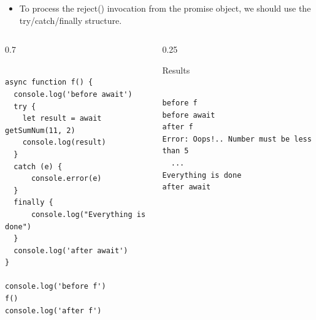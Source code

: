 \begin{frame}[fragile]{}

\begin{itemize}
	\item To process the reject() invocation from the promise object, we should use the try/catch/finally structure. 
\end{itemize}

\begin{columns}%
\begin{column}{0.7\textwidth}%
\begin{Code}{}%
\begin{lstlisting}[firstnumber=1, label=glabels, xleftmargin=0pt, basicstyle=\tiny]% 

async function f() {
  console.log('before await')
  try {
    let result = await getSumNum(11, 2)
    console.log(result)
  }
  catch (e) {
      console.error(e)
  }
  finally {
      console.log("Everything is done")
  }
  console.log('after await')
}

console.log('before f')
f()
console.log('after f')
\end{lstlisting}%
\end{Code}%
\end{column}%
\begin{column}{0.25\textwidth}%
\begin{Command}{Results}%
\begin{lstlisting}[firstnumber=1, label=glabels, xleftmargin=0pt, basicstyle=\tiny]% 

before f
before await
after f
Error: Oops!.. Number must be less than 5
  ...
Everything is done
after await
\end{lstlisting}%
\end{Command}%
\end{column}%
\end{columns}%
\end{frame}